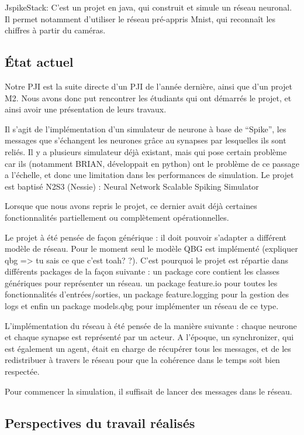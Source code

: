 \documentclass{article}
\begin{document}
        JspikeStack: C’est un projet en java, qui construit et simule un réseau neuronal. Il permet notamment d’utiliser le réseau pré-appris Mnist, qui reconnaît les chiffres à partir du caméras.

\subsection{État actuel}
Notre PJI est la suite directe d’un PJI de l’année dernière, ainsi que d’un projet M2. Nous avons donc put rencontrer les étudiants qui ont démarrés le projet, et ainsi avoir une présentation de leurs travaux.

Il s’agit de l’implémentation d’un simulateur de neurone à base de “Spike”, les messages que s’échangent les neurones grâce au synapses par lesquelles ils sont reliés. Il y a plusieurs simulateur déjà existant, mais qui pose certain problème car ils (notamment BRIAN, développait en python) ont le problème de ce passage a l’échelle, et donc une limitation dans les performances de simulation. Le projet est baptisé N2S3 (Nessie) : Neural Network Scalable Spiking Simulator

Lorsque que nous avons repris le projet, ce dernier avait déjà certaines fonctionnalités partiellement ou complètement opérationnelles.

Le projet à été pensée de façon générique : il doit pouvoir s’adapter a différent modèle de réseau. Pour le moment seul le modèle QBG est implémenté (expliquer qbg => tu sais ce que c’est toah? ?). C’est pourquoi le projet est répartie dans différents packages de la façon suivante : un package core contient les classes génériques pour représenter un réseau. un package feature.io pour toutes les fonctionnalités d’entrées/sorties, un package feature.logging pour la gestion des logs et enfin un package models.qbg pour implémenter un réseau de ce type.

L’implémentation du réseau à été pensée de la manière suivante : chaque neurone et chaque synapse est représenté par un acteur. A l’époque, un synchronizer, qui est également  un agent, était en charge de récupérer tous les messages, et de les redistribuer à travers le réseau pour que la cohérence dans le temps soit bien respectée. 

Pour commencer la simulation, il suffisait de lancer des messages dans le réseau.


\subsection{Perspectives du travail réalisés}
\end{document}
